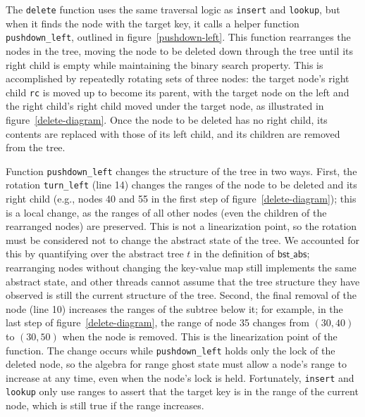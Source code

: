 \documentclass[runningheads]{llncs}
\newcommand{\treerep}{\ensuremath{\mathsf{bst\_abs}}}
\begin{document}
The \lstinline{delete} function uses the same traversal logic as \lstinline{insert} and \lstinline{lookup}, but when it finds the node with the target key, it calls a helper function \lstinline{pushdown_left}, outlined in figure~\ref{pushdown-left}. This function rearranges the nodes in the tree, moving the node to be deleted down through the tree until its right child is empty while maintaining the binary search property. This is accomplished by repeatedly rotating sets of three nodes: the target node's right child \lstinline{rc} is moved up to become its parent, with the target node on the left and the right child's right child moved under the target node, as illustrated in figure~\ref{delete-diagram}.
Once the node to be deleted has no right child, its contents are replaced with those of its left child, and its children are removed from the tree.

Function \lstinline{pushdown_left} changes the structure of the tree in two ways. First, the rotation \lstinline{turn_left} (line 14) changes the ranges of the node to be deleted and its right child (e.g., nodes 40 and 55 in the first step of figure~\ref{delete-diagram}); this is a local change, as the ranges of all other nodes (even the children of the rearranged nodes) are preserved. This is not a linearization point, so the rotation must be considered not to change the abstract state of the tree. We accounted for this by quantifying over the abstract tree $t$ in the definition of $\treerep$; rearranging nodes without changing the key-value map still implements the same abstract state, and other threads cannot assume that the tree structure they have observed is still the current structure of the tree. Second, the final removal of the node (line 10) increases the ranges of the subtree below it; for example, in the last step of figure~\ref{delete-diagram}, the range of node 35 changes from $(30, 40)$ to $(30, 50)$ when the node is removed. This is the linearization point of the function. The change occurs while \lstinline{pushdown_left} holds only the lock of the deleted node, so the algebra for range ghost state must allow a node's range to increase at any time, even when the node's lock is held. Fortunately, \lstinline{insert} and \lstinline{lookup} only use ranges to assert that the target key is in the range of the current node, which is still true if the range increases.

\usetikzlibrary{positioning}
\end{document}
